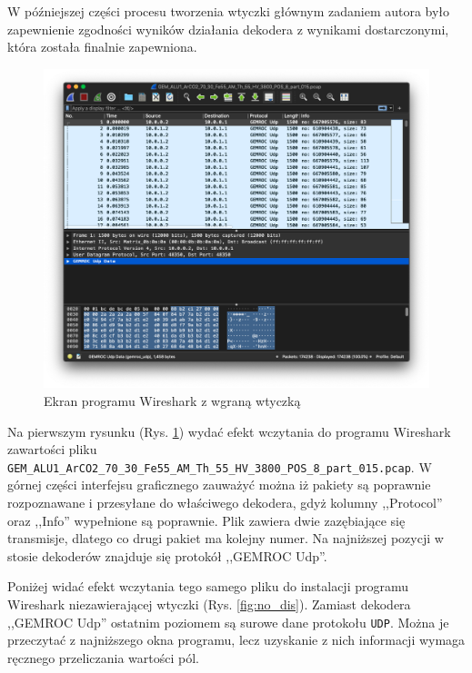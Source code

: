 \documentclass[a4paper, 12pt, twoside, openright]{article}
\begin{document}
	W późniejszej części procesu tworzenia wtyczki głównym zadaniem autora było zapewnienie zgodności wyników działania
	dekodera z wynikami dostarczonymi, która została finalnie zapewniona.

		\begin{figure}[H]
			\centering
				\includegraphics[width=1.0\textwidth]{img/screenshot_dissector.png}
			\caption{Ekran programu Wireshark z wgraną wtyczką}
			\label{fig:dis}
		\end{figure}

	Na pierwszym rysunku (Rys. \ref{fig:dis}) wydać efekt wczytania do programu Wireshark zawartości pliku
	\texttt{GEM\_ALU1\_ArCO2\_70\_30\_Fe55\_AM\_Th\_55\_HV\_3800\_POS\_8\_part\_015.pcap}.
	W górnej części interfejsu graficznego zauważyć można iż pakiety są poprawnie rozpoznawane i przesyłane do właściwego dekodera, gdyż
	kolumny ,,Protocol'' oraz ,,Info'' wypełnione są poprawnie. Plik zawiera dwie zazębiające się transmisje, dlatego co drugi pakiet ma kolejny numer.
	Na najniższej pozycji w stosie dekoderów znajduje się protokół ,,GEMROC Udp''.

	Poniżej widać efekt wczytania tego samego pliku do instalacji programu Wireshark niezawierającej wtyczki (Rys. \ref{fig:no_dis}).
	Zamiast dekodera ,,GEMROC Udp'' ostatnim poziomem są surowe dane protokołu \texttt{UDP}. Można je przeczytać z najniższego okna programu,
	lecz uzyskanie z nich informacji wymaga ręcznego przeliczania wartości pól.
\end{document}
